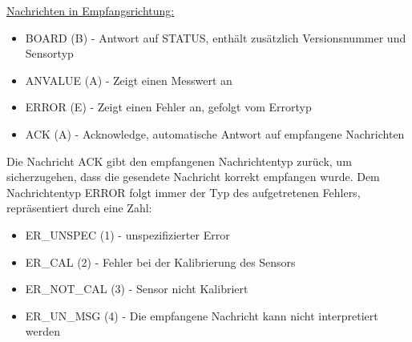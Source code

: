 \underline{Nachrichten in Empfangsrichtung:}
\begin{itemize}
    \item BOARD (B) - Antwort auf STATUS, enthält zusätzlich Versionsnummer und Sensortyp
    \item ANVALUE (A) - Zeigt einen Messwert an
    \item ERROR (E) - Zeigt einen Fehler an, gefolgt vom Errortyp
    \item ACK (A) - Acknowledge, automatische Antwort auf empfangene Nachrichten
\end{itemize}

Die Nachricht ACK gibt den empfangenen Nachrichtentyp zurück, um sicherzugehen, dass die gesendete Nachricht korrekt empfangen wurde.
Dem Nachrichtentyp ERROR folgt immer der Typ des aufgetretenen Fehlers, repräsentiert durch eine Zahl:

\begin{itemize}
    \item ER\_UNSPEC (1) - unspezifizierter Error
    \item ER\_CAL (2) - Fehler bei der Kalibrierung des Sensors
    \item ER\_NOT\_CAL (3) - Sensor nicht Kalibriert
    \item ER\_UN\_MSG (4) - Die empfangene Nachricht kann nicht interpretiert werden
\end{itemize}